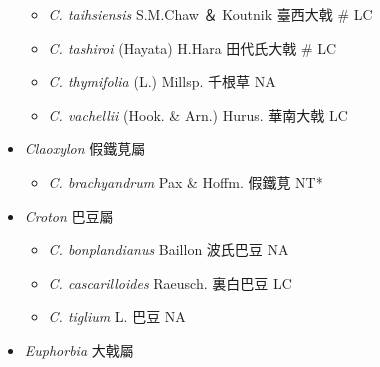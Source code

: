\begin{itemize}
\begin{itemize}
        \item[] \textit{C. taihsiensis} S.M.Chaw ＆ Koutnik  臺西大戟  \# LC
        \item[] \textit{C. tashiroi} (Hayata) H.Hara  田代氏大戟  \# LC
        \item[] \textit{C. thymifolia} (L.) Millsp.  千根草   NA
        \item[] \textit{C. vachellii} (Hook. \& Arn.) Hurus.  華南大戟   LC
  \end{itemize}
 \item[] \textit{Claoxylon} 假鐵莧屬
                                
  \begin{itemize}
        \item[] \textit{C. brachyandrum} Pax \& Hoffm.  假鐵莧   NT*
  \end{itemize}
 \item[] \textit{Croton} 巴豆屬
                                
  \begin{itemize}
        \item[] \textit{C. bonplandianus} Baillon  波氏巴豆   NA
        \item[] \textit{C. cascarilloides} Raeusch.  裏白巴豆   LC
        \item[] \textit{C. tiglium} L.  巴豆   NA
  \end{itemize}
 \item[] \textit{Euphorbia} 大戟屬
                                

\end{itemize}
